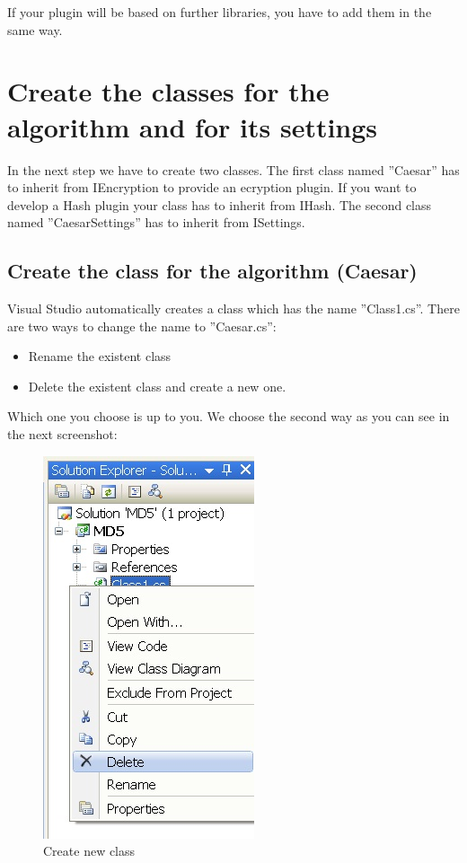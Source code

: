 If your plugin will be based on further libraries, you have to add them in the same way.
\section{Create the classes for the algorithm and for its settings}\label{sec:CreateTheClassesForTheAlgorithmAndForItsSettings}
In the next step we have to create two classes. The first class named ''Caesar'' has to inherit from IEncryption to provide an ecryption plugin. If you want to develop a Hash plugin your class has to inherit from IHash.
The second class named ''CaesarSettings'' has to inherit from ISettings.
\subsection{Create the class for the algorithm (Caesar)}\label{sec:CreateTheClassForTheAlgorithmCaesar}
Visual Studio automatically creates a class which has the name ''Class1.cs''.  There are two ways to change the name to ''Caesar.cs'':
\renewcommand{\labelitemi}{-}
\begin{itemize}
	\item Rename the existent class
	\item Delete the existent class and create a new one.
\end{itemize}\clearpage
Which one you choose is up to you. We choose the second way as you can see in the next screenshot:
\begin{figure}[h!]
	\centering
		\includegraphics{figures/new_class.jpg}
	\caption{Create new class}
	\label{fig:new_class}
\end{figure}\clearpage
